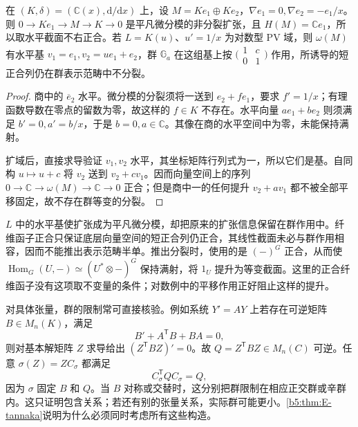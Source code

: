 \begin{proposition}\label{b5:prop:E-logarithmic-extension}
	在 \((K,\delta)=(\mathbb C(x),\mathrm d/\mathrm dx)\) 上，设 \(M=Ke_1\oplus Ke_2\)，\(\nabla e_1=0,\nabla e_2=-e_1/x\)。则 \(0\to Ke_1\to M\to K\to0\) 是平凡微分模的非分裂扩张，且 \(H(M)=\mathbb Ce_1\)，所以取水平截面不右正合。若 \(L=K(u)\)、\(u'=1/x\) 为对数型 PV 域，则 \(\omega(M)\) 有水平基 \(v_1=e_1,v_2=ue_1+e_2\)，群 \(\mathbb G_a\) 在这组基上按
	\(\bigl(\begin{smallmatrix}1&c\\0&1\end{smallmatrix}\bigr)\) 作用，所诱导的短正合列仍在群表示范畴中不分裂。
\end{proposition}
\begin{proof}
	商中的 \(\overline e_2\) 水平。微分模的分裂须将一送到 \(e_2+fe_1\)，要求 \(f'=1/x\)；有理函数导数在零点的留数为零，故这样的 \(f\in K\) 不存在。水平向量 \(ae_1+be_2\) 则须满足 \(b'=0,a'=b/x\)，于是 \(b=0,a\in\mathbb C\)。其像在商的水平空间中为零，未能保持满射。

	扩域后，直接求导验证 \(v_1,v_2\) 水平，其坐标矩阵行列式为一，所以它们是基。自同构 \(u\mapsto u+c\) 将 \(v_2\) 送到 \(v_2+cv_1\)。因而向量空间上的序列 \(0\to\mathbb C\to\omega(M)\to\mathbb C\to0\) 正合；但是商中一的任何提升 \(v_2+av_1\) 都不被全部平移固定，故不存在群等变的分裂。
\end{proof}

\(L\) 中的水平基使扩张成为平凡微分模，却把原来的扩张信息保留在群作用中。纤维函子正合只保证底层向量空间的短正合列仍正合，其线性截面未必与群作用相容，因而不能推出表示范畴半单。推出分裂时，使用的是 \((-)^G\) 正合，从而使 \(\operatorname{Hom}_G(U,-)\simeq(U^*\otimes-)^G\) 保持满射，将 \(1_U\) 提升为等变截面。这里的正合纤维函子没有这项取不变量的条件；对数例中的平移作用正好阻止这样的提升。

\ProseParagraphBreak
对具体张量，群的限制常可直接核验。例如系统 \(Y'=AY\) 上若存在可逆矩阵 \(B\in M_n(K)\)，满足
\begin{equation}\label{b5:eq:E-horizontal-pairing}
	B'+A^{\mathsf T}B+BA=0,
\end{equation}
则对基本解矩阵 \(Z\) 求导给出 \((Z^{\mathsf T}BZ)'=0\)。故 \(Q=Z^{\mathsf T}BZ\in M_n(C)\) 可逆。任意 \(\sigma(Z)=ZC_\sigma\) 都满足
\[
	C_\sigma^{\mathsf T}QC_\sigma=Q,
\]
因为 \(\sigma\) 固定 \(B\) 和 \(Q\)。当 \(B\) 对称或交替时，这分别把群限制在相应正交群或辛群内。这只证明包含关系；若还有别的张量关系，实际群可能更小。\cref{b5:thm:E-tannaka}说明为什么必须同时考虑所有这些构造。

